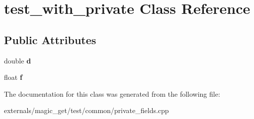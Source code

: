 \hypertarget{classtest__with__private}{}\section{test\+\_\+with\+\_\+private Class Reference}
\label{classtest__with__private}
\subsection*{Public Attributes}
\begin{DoxyCompactItemize}
\item 
\mbox{\label{classtest__with__private_ac79dd02af8ac85202b57756aa76b6bac}} 
double {\bfseries d}
\item 
\mbox{\label{classtest__with__private_a2350500cac4de9ac8132b87d2375215e}} 
float {\bfseries f}
\end{DoxyCompactItemize}


The documentation for this class was generated from the following file\+:\begin{DoxyCompactItemize}
\item 
externals/magic\+\_\+get/test/common/private\+\_\+fields.\+cpp\end{DoxyCompactItemize}
